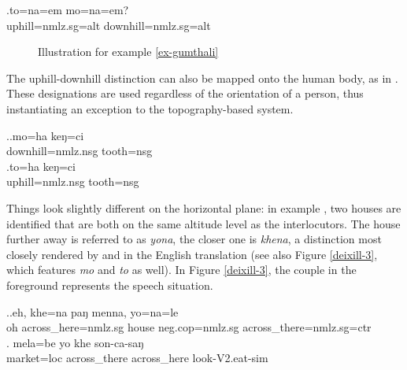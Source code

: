 \exg.\label{ex-gumthali}to=na=em mo=na=em?\\
uphill{\sc =nmlz.sg=alt} downhill{\sc =nmlz.sg=alt}\\

\begin{figure}
\centering
\setlength{\fboxsep}{0pt}
\caption{Illustration for example \ref{ex-gumthali}}\label{deixill-2}
\end{figure}

The uphill-downhill distinction can also be mapped onto the human body, as in \Next. These designations are used regardless of the orientation of a person, thus instantiating an exception to the topography-based system.

\ex.\ag.mo=ha keŋ=ci \\
downhill{\sc =nmlz.nsg} tooth{\sc =nsg} \\
\bg.to=ha keŋ=ci\\
uphill{\sc =nmlz.nsg} tooth{\sc =nsg} \\


Things look slightly different on the horizontal plane: in example \Next[a], two houses are identified  that are both on the same altitude level as the interlocutors. The house further away is referred to as \emph{yona}, the closer one is \emph{khena}, a distinction most closely rendered by  and  in the English translation (see also Figure \ref{deixill-3}, which  features  \emph{mo} and \emph{to} as well). In Figure \ref{deixill-3}, the couple in the foreground represents the speech situation.

\ex.\ag.\label{khenamenna}eh, khe=na paŋ menna, yo=na=le\\
oh across\_here{\sc =nmlz.sg} house {\sc neg.cop=nmlz.sg} across\_there{\sc =nmlz.sg=ctr}\\
 \bg. mela=be      yo   khe    son-ca-saŋ\\
market{\sc =loc} across\_there across\_here look{\sc -V2.eat-sim} \\
 
 
